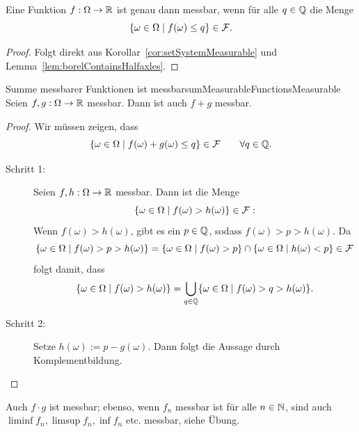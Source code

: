 \documentclass[language=ngerman]{../../Template/TemplateLecture}
\begin{document}
\begin{corollary}
    Eine Funktion $f: \Omega \to \mathbb{R}$ ist genau dann messbar, wenn für alle $q \in \mathbb{Q}$ die Menge 
    \begin{equation}
        \{\omega \in \Omega \mid f(\omega) \leq q\} \in \mathcal{F}.
    \end{equation}
\end{corollary}
\begin{proof}
    Folgt direkt aus Korollar~\ref{cor:setSystemMeasurable} und Lemma~\ref{lem:borelContainsHalfaxles}.
\end{proof}

\begin{lem}{Summe messbarer Funktionen ist messbar}{sumMeasurableFunctionsMeasurable}
    Seien $f, g: \Omega \to \mathbb{R}$ messbar. Dann ist auch $f + g$ messbar.
\end{lem}
\begin{proof}
    Wir müssen zeigen, dass 
    \begin{equation}
        \{\omega \in \Omega \mid f(\omega) + g(\omega) \leq q\} \in \mathcal{F} \quad \quad \forall q \in \mathbb{Q}.
    \end{equation}
    \begin{description}
        \item[Schritt 1:] Seien $f, h: \Omega \to \mathbb{R}$ messbar. Dann ist die Menge
        \begin{equation}
            \{\omega \in \Omega \mid f(\omega) > h(\omega)\} \in \mathcal{F}:
        \end{equation}
        Wenn $f(\omega) > h(\omega)$, gibt es ein $p \in \mathbb{Q}$, sodass $f(\omega) > p > h(\omega)$. Da 
        \begin{equation}
            \{\omega \in \Omega \mid f(\omega) > p > h(\omega)\} = \{\omega \in \Omega \mid f(\omega) > p\} \cap \{\omega \in \Omega \mid h(\omega) < p\} \in \mathcal{F}
        \end{equation}
        folgt damit, dass 
        \begin{equation}
            \{\omega \in \Omega \mid f(\omega) > h(\omega)\} = \bigcup_{q \in \mathbb{Q}} \{\omega \in \Omega \mid f(\omega) > q > h(\omega)\}.
        \end{equation}
        \item[Schritt 2:] Setze $h(\omega) := p - g(\omega)$. Dann folgt die Aussage durch Komplementbildung.
    \end{description}
\end{proof}

\begin{bemerkung}
    Auch $f \cdot g$ ist messbar; ebenso, wenn $f_n$ messbar ist für alle $n \in \mathbb{N}$, sind auch $\liminf f_n, \limsup f_n, \inf f_n$ etc. messbar, siehe Übung. 
\end{bemerkung}
\end{document}
